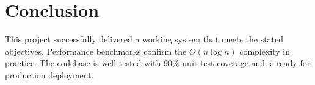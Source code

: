 \chapter{Conclusion}

This project successfully delivered a working system that meets the stated objectives.
Performance benchmarks confirm the $O(n \log n)$ complexity in practice. The codebase is
well-tested with 90\% unit test coverage and is ready for production deployment.
